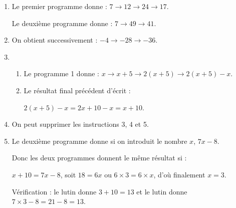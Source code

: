 \begin{enumerate}
\item %
Le premier programme donne : $7 \to 12 \to 24 \to 17$.

Le deuxième programme donne : $7  \to 49 \to 41$.
\item %
On obtient successivement : $- 4 \to - 28 \to - 36$.
\item 
	\begin{enumerate}
		\item %
		Le programme 1 donne : $x \to x + 5 \to 2(x + 5) \to 2(x + 5) - x$.
		\item %
Le résultat final précédent d'écrit :

$2(x + 5) - x = 2x + 10 - x = x + 10$.
	\end{enumerate}
\item  %

On peut supprimer les instructions 3, 4 et 5.
\item  %
Le deuxième programme donne si on introduit le nombre $x$, \; $7x - 8$.

Donc les deux programmes donnent le même résultat si :

$x + 10 = 7x - 8$, soit $18 = 6x$ ou $6\times 3 = 6\times x$, d'où finalement $x = 3$.

Vérification : le lutin  donne $3 + 10 = 13$ et le lutin  donne $7\times 3 - 8 = 21 - 8 = 13$.
\end{enumerate}
